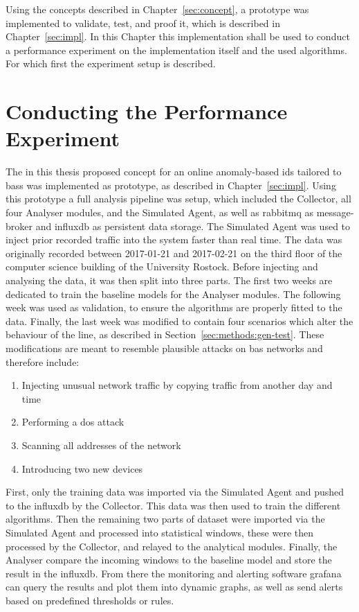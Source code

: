 Using the concepts described in Chapter~\ref{sec:concept}, a prototype was implemented to validate, test, and proof it, which is described in Chapter~\ref{sec:impl}.
In this Chapter this implementation shall be used to conduct a performance experiment on the implementation itself and the used algorithms.
For which first the experiment setup is described.

\section{Conducting the Performance Experiment}
\label{sec:results:experiment}

The in this thesis proposed concept for an online anomaly-based \gls{ids} tailored to \glspl{bas} was implemented as prototype, as described in Chapter~\ref{sec:impl}.
Using this prototype a full analysis pipeline was setup, which included the Collector, all four Analyser modules, and the Simulated Agent, as well as \gls{rabbitmq} as message-broker and \gls{influxdb} as persistent data storage.
The Simulated Agent was used to inject prior recorded traffic into the system faster than real time.
The data was originally recorded between 2017-01-21 and 2017-02-21 on the third floor of the computer science building of the University Rostock.
Before injecting and analysing the data, it was then split into three parts. The first two weeks are dedicated to train the baseline models for the Analyser modules. The following week was used as validation, to ensure the algorithms are properly fitted to the data. Finally, the last week was modified to contain four scenarios which alter the behaviour of the line, as described in Section~\ref{sec:methods:gen-test}.
\newpage
These modifications are meant to resemble plausible attacks on \gls{bas} networks and therefore include:

\begin{enumerate}
	\item Injecting unusual network traffic by copying traffic from another day and time
	\item Performing a \gls{dos} attack
	\item Scanning all addresses of the network
	\item Introducing two new devices
\end{enumerate}

First, only the training data was imported via the Simulated Agent and pushed to the \gls{influxdb} by the Collector. This data was then used to train the different algorithms.
Then the remaining two parts of dataset were imported via the Simulated Agent and processed into statistical windows, these were then processed by the Collector, and relayed to the analytical modules. Finally, the Analyser compare the incoming windows to the baseline model and store the result in the \gls{influxdb}. From there the monitoring and alerting software \gls{grafana} can query the results and plot them into dynamic graphs, as well as send alerts based on predefined thresholds or rules.

